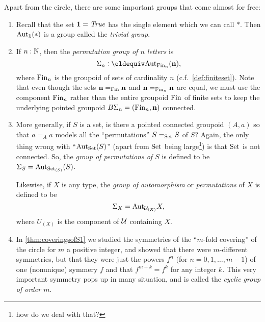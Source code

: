 \begin{example}\label{ex:groups}
  Apart from the circle, there are some important groups that come almost for free:
  \begin{enumerate}
  \item Recall that the set $\mathbf{1} =\mathop{\mathit{True}}$ has the single element which we can call $*$. Then $\mathrm{Aut}_{\mathbf{1} }(*)$ is a group called the \emph{trivial group}.
  \item If $n:\mathbb{N}$, then the \emph{permutation group of $n$ letters} is 
$$\Sigma_n\defequi\aut_{\fin_n}(\bn{n} ),$$ 
where $\operatorname{Fin}_n$ is the groupoid of sets of cardinality $n$ (c.f.~\ref{def:finiteset}).  Note that even though the sets $\mathbf{n} =_{\operatorname{Fin}}\mathbf{n} $ and $\mathbf{n} =_{\operatorname{Fin}_n}\mathbf{n} $ are equal, we must use the component $\operatorname{Fin}_n$ rather than the entire groupoid $\operatorname{Fin}$ of finite sets to keep the underlying pointed groupoid $B\Sigma_n=(\operatorname{Fin}_n,\mathbf{n} )$ connected.
  \item More generally, if $S$ is a set, is there a pointed connected groupoid $(A,a)$ so that $a=_Aa$ models all the ``permutations'' $S=_{\mathord{\mathrm{Set}}}S$ of $S$?  Again, the only thing wrong with ``$\mathrm{Aut}_{\mathord{\mathrm{Set}}}(S)$'' (apart from $\mathord{\mathrm{Set}}$ being large\footnote{how do we deal with that?}) is that $\mathord{\mathrm{Set}}$ is not connected. 
%
 So, 
the \emph{group of permutations of $S$} is defined to be $\Sigma_{S}=\mathrm{Aut}_{\mathord{\mathrm{Set}}_{(S)}}(S)$.  

Likewise, if $X$ is any type, the \emph{group of automorphism} or \emph{permutations} of $X$ is defined to be 
$$\Sigma_X=\mathrm{Aut}_{\mathcal{U}_{(X)}}X,$$
 where $U_{(X)}$ is the component of $\mathcal{U}$ containing $X$.
\item In \cref{thm:coveringsofS1} we studied the symmetries of the ``$m$-fold covering'' of the circle for $m$ a positive integer, and showed that there were $m$-different symmetries, but that they were just the powers $f^n$ (for $n=0,1,\dots,m-1$) of one (nonunique) symmery $f$ and that $f^{m+k}=f^k$ for any integer $k$.  This very important symmetry pops up in many situation, and is called the \emph{cyclic group of order $m$}.


\end{enumerate}
\end{example}
